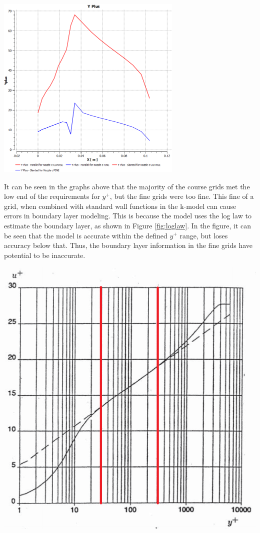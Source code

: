 \documentclass[12pt]{article} %
\begin{document}
\begin{center}
    \includegraphics[width=.45\linewidth]{YPlus_C.png}
    \label{fig:YPlusC}
\end{center}

It can be seen in the graphs above that the majority of the course grids met the low end of the requirements for $y^+$, but the fine grids were too fine. This fine of a grid, when combined with standard wall functions in the k-\textepsilon\:model can cause errors in boundary layer modeling. This is because the model uses the log law to estimate the boundary layer, as shown in Figure \ref{fig:loglaw}. In the figure, it can be seen that the model is accurate within the defined $y^+$ range, but loses accuracy below that. Thus, the boundary layer information in the fine grids have potential to be inaccurate.

\begin{center}
    \includegraphics[width=.4\linewidth]{LogLaw.PNG}
    \label{fig:loglaw}
\end{center}
\end{document}
